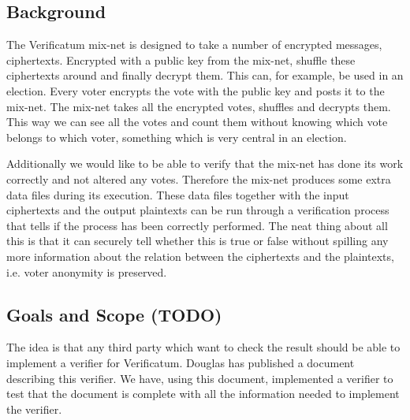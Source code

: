 \subsection{Background}

The Verificatum mix-net is designed to take a number of encrypted messages, ciphertexts. Encrypted with a public key from the mix-net, shuffle these ciphertexts around and finally decrypt them. This can, for example, be used in an election. Every voter encrypts the vote with the public key and posts it to the mix-net. The mix-net takes all the encrypted votes, shuffles and decrypts them. This way we can see all the votes and count them without knowing which vote belongs to which voter, something which is very central in an election.

Additionally we would like to be able to verify that the mix-net has done its work correctly and not altered any votes. Therefore the mix-net produces some extra data files during its execution. These data files together with the input ciphertexts and the output plaintexts can be run through a verification process that tells if the process has been correctly performed. The neat thing about all this is that it can securely tell whether this is true or false without spilling any more information about the relation between the ciphertexts and the plaintexts, i.e. voter anonymity is preserved.

\subsection{Goals and Scope (TODO)}

The idea is that any third party which want to check the result should be able to implement a verifier for Verificatum. Douglas has published a document describing this verifier. We have, using this document, implemented a verifier to test that the document is complete with all the information needed to implement the verifier.
